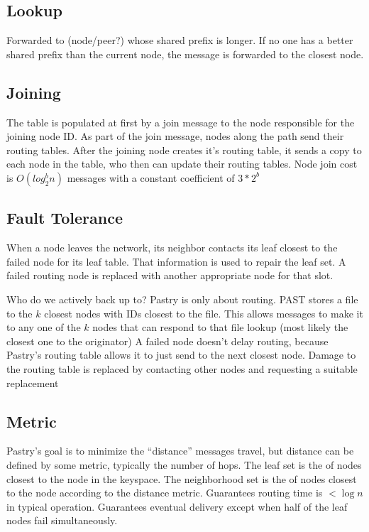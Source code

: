 \documentclass[10pt,letterpaper]{report}
\begin{document}
\subsection*{Lookup}
Forwarded to (node/peer?) whose shared prefix is longer.  If no one has a better shared prefix than the current node, the message is forwarded to the closest  node.




\subsection*{Joining}
The table is populated at first by a join message to the node responsible for the joining node ID.  
As part of the join message, nodes  along the path send their routing tables.  
After the joining node creates it's routing table, it sends a copy to each node in the table, who then can update their routing tables.   
Node join cost is $O(log_2^b n)$ messages  with  a constant  coefficient  of $3*2^b$




\subsection*{Fault Tolerance}

When a node leaves the network, its neighbor contacts its leaf closest to the failed node  for its leaf table.  That information is used to repair the leaf set.  A failed routing node is replaced with another appropriate node for that slot.  

Who do we actively back up to? 
Pastry is only about routing.
PAST stores a file to the $k$ closest nodes with IDs closest to the file.  
This allows messages to make it to any one of the $k$ nodes that can respond to that file lookup (most likely the closest one to the originator)
A failed node doesn't delay  routing, because Pastry's routing table allows it to just send to the next closest node.  
Damage to the routing table is replaced by contacting other nodes and requesting a suitable replacement




\subsection*{Metric}
Pastry's goal is to minimize the ``distance'' messages travel, but distance can be defined by some metric, typically the number of hops.
The leaf set is the  of nodes closest to the node in the keyspace.  
The neighborhood set is the of nodes closest to the node according to the distance metric. 
Guarantees routing time is  $<\log n$ in typical operation.  
Guarantees eventual delivery except when half of the leaf nodes fail simultaneously.
\end{document}
